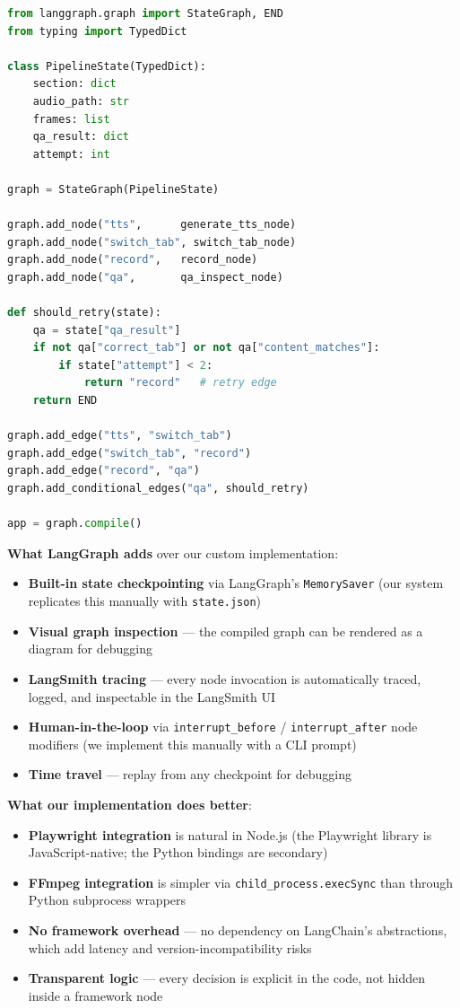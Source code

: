 \documentclass[12pt,a4paper]{article}
\begin{document}
\begin{lstlisting}[language=Python,caption=LangGraph sketch of the section recording loop]
from langgraph.graph import StateGraph, END
from typing import TypedDict

class PipelineState(TypedDict):
    section: dict
    audio_path: str
    frames: list
    qa_result: dict
    attempt: int

graph = StateGraph(PipelineState)

graph.add_node("tts",      generate_tts_node)
graph.add_node("switch_tab", switch_tab_node)
graph.add_node("record",   record_node)
graph.add_node("qa",       qa_inspect_node)

def should_retry(state):
    qa = state["qa_result"]
    if not qa["correct_tab"] or not qa["content_matches"]:
        if state["attempt"] < 2:
            return "record"   # retry edge
    return END

graph.add_edge("tts", "switch_tab")
graph.add_edge("switch_tab", "record")
graph.add_edge("record", "qa")
graph.add_conditional_edges("qa", should_retry)

app = graph.compile()
\end{lstlisting}

\textbf{What LangGraph adds} over our custom implementation:
\begin{itemize}[leftmargin=2em]
  \item \textbf{Built-in state checkpointing} via LangGraph's \texttt{MemorySaver}
        (our system replicates this manually with \texttt{state.json})
  \item \textbf{Visual graph inspection} --- the compiled graph can be rendered
        as a diagram for debugging
  \item \textbf{LangSmith tracing} --- every node invocation is automatically
        traced, logged, and inspectable in the LangSmith UI
  \item \textbf{Human-in-the-loop} via \texttt{interrupt\_before} / \texttt{interrupt\_after}
        node modifiers (we implement this manually with a CLI prompt)
  \item \textbf{Time travel} --- replay from any checkpoint for debugging
\end{itemize}

\textbf{What our implementation does better}:
\begin{itemize}[leftmargin=2em]
  \item \textbf{Playwright integration} is natural in Node.js (the Playwright
        library is JavaScript-native; the Python bindings are secondary)
  \item \textbf{FFmpeg integration} is simpler via \texttt{child\_process.execSync}
        than through Python subprocess wrappers
  \item \textbf{No framework overhead} --- no dependency on LangChain's
        abstractions, which add latency and version-incompatibility risks
  \item \textbf{Transparent logic} --- every decision is explicit in the code,
        not hidden inside a framework node
\end{itemize}
\end{document}
